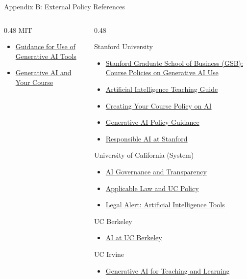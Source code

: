 \documentclass[aspectratio=169]{beamer}
\begin{document}
\begin{frame}[t]{Appendix B: External Policy References}
\begin{columns}[t]
\begin{column}{0.48\textwidth}
MIT
\begin{itemize}
  \item \href{https://ist.mit.edu/ai-guidance}{Guidance for Use of Generative AI Tools}
  \item \href{https://tll.mit.edu/teaching-resources/course-design/gen-ai-your-course/}{Generative AI and Your Course}
\end{itemize}

  \end{column}

  \begin{column}{0.48\textwidth}

Stanford University
\begin{itemize}
  \item \href{https://tlhub.stanford.edu/docs/course-policies-on-generative-ai-use/}{Stanford Graduate School of Business (GSB): Course Policies on Generative AI Use}
  \item \href{https://teachingcommons.stanford.edu/teaching-guides/artificial-intelligence-teaching-guide}{Artificial Intelligence Teaching Guide}
  \item \href{https://teachingcommons.stanford.edu/teaching-guides/artificial-intelligence-teaching-guide/creating-your-course-policy-ai}{Creating Your Course Policy on AI}
  \item \href{https://communitystandards.stanford.edu/generative-ai-policy-guidance}{Generative AI Policy Guidance}
  \item \href{https://uit.stanford.edu/security/responsibleai}{Responsible AI at Stanford}
\end{itemize}

University of California (System)
\begin{itemize}
  \item \href{https://ai.universityofcalifornia.edu/governance-transparency/}{AI Governance and Transparency}
  \item \href{https://ai.universityofcalifornia.edu/governance-transparency/applicable-law-and-policy.html}{Applicable Law and UC Policy}
  \item \href{https://www.ucop.edu/ethics-compliance-audit-services/_files/compliance/ai/ai-alert.pdf}{Legal Alert: Artificial Intelligence Tools}
\end{itemize}

UC Berkeley
\begin{itemize}
  \item \href{https://technology.berkeley.edu/AI}{AI at UC Berkeley}
\end{itemize}

UC Irvine
  \begin{itemize}
    \item \href{https://dtei.uci.edu/generative-ai/}{Generative AI for Teaching and Learning}
  \end{itemize}


  \end{column}

\end{columns}
\end{frame}
\end{document}
